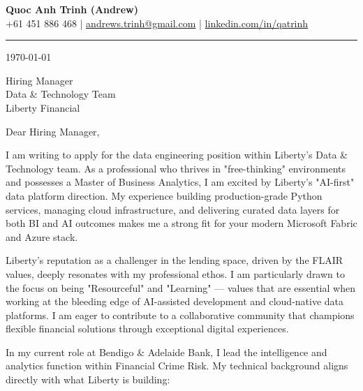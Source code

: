 \documentclass[11pt, a4paper]{article}
\begin{document}
\begin{center}
    {\LARGE \textbf{Quoc Anh Trinh (Andrew)}}\\[4pt]
    {\small
        +61 451 886 468 \quad|\quad
        \href{mailto:andrews.trinh@gmail.com}{andrews.trinh@gmail.com} \quad|\quad
        \href{https://www.linkedin.com/in/qatrinh}{linkedin.com/in/qatrinh}
    }
\end{center}

\vspace{4pt}
\hrule
\vspace{14pt}

\today

\vspace{8pt}

Hiring Manager\\
Data \& Technology Team\\
Liberty Financial

\vspace{10pt}

Dear Hiring Manager,

I am writing to apply for the data engineering position within Liberty’s Data \& Technology team. As a professional who thrives in "free-thinking" environments and possesses a Master of Business Analytics, I am excited by Liberty’s "AI-first" data platform direction. My experience building production-grade Python services, managing cloud infrastructure, and delivering curated data layers for both BI and AI outcomes makes me a strong fit for your modern Microsoft Fabric and Azure stack.

Liberty’s reputation as a challenger in the lending space, driven by the FLAIR values, deeply resonates with my professional ethos. I am particularly drawn to the focus on being "Resourceful" and "Learning" — values that are essential when working at the bleeding edge of AI-assisted development and cloud-native data platforms. I am eager to contribute to a collaborative community that champions flexible financial solutions through exceptional digital experiences.

In my current role at Bendigo \& Adelaide Bank, I lead the intelligence and analytics function within Financial Crime Risk. My technical background aligns directly with what Liberty is building:
\end{document}
